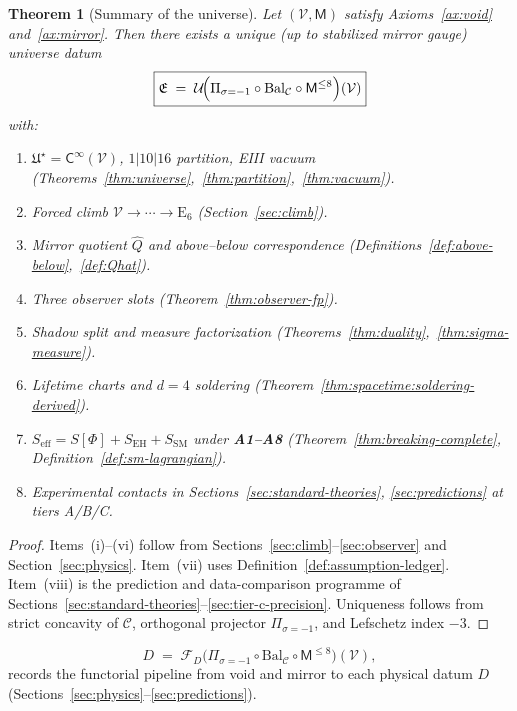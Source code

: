 \documentclass[11pt]{article}
\theoremstyle{plain}
\newtheorem{theorem}{Theorem}[section]
\theoremstyle{definition}
\theoremstyle{remark}
\numberwithin{equation}{section}
\newcommand{\E}[1]{\mathrm{E}_{#1}}
\newcommand{\Void}{\mathcal{V}}
\newcommand{\Mirror}{\mathsf{M}}
\newcommand{\Climb}{\mathsf{C}}
\newcommand{\capacity}{\mathcal{C}}
\newcommand{\orderparam}{\Phi}
\begin{document}
\begin{theorem}[Summary of the universe]\label{thm:universe-summary}
Let $(\Void,\Mirror)$ satisfy Axioms~\ref{ax:void} and~\ref{ax:mirror}. Then
there exists a unique (up to stabilized mirror gauge) universe datum
\begin{equation}\label{eq:universe-summary}
  \boxed{%
  \mathfrak{E}
  \;=\;
  \mathcal{U}\!\Bigl(
    \Pi_{\sigma=-1}\circ\mathrm{Bal}_{\mathcal{C}}\circ\Mirror^{\leq 8}
  \Bigr)(\Void)}
\end{equation}
with:
\begin{enumerate}[label=(\roman*),leftmargin=*]
  \item $\mathfrak{U}^\star=\Climb^\infty(\Void)$, $1|10|16$ partition, EIII
    vacuum (Theorems~\ref{thm:universe},~\ref{thm:partition},~\ref{thm:vacuum}).
  \item Forced climb $\Void\to\cdots\to\E{6}$ (Section~\ref{sec:climb}).
  \item Mirror quotient $\hat Q$ and above--below correspondence
    (Definitions~\ref{def:above-below},~\ref{def:Qhat}).
  \item Three observer slots (Theorem~\ref{thm:observer-fp}).
  \item Shadow split and measure factorization
    (Theorems~\ref{thm:duality},~\ref{thm:sigma-measure}).
  \item Lifetime charts and $d=4$ soldering
    (Theorem~\ref{thm:spacetime:soldering-derived}).
  \item $S_{\mathrm{eff}}=S[\orderparam]+S_{\mathrm{EH}}+S_{\mathrm{SM}}$
    under \textbf{A1--A8}
    (Theorem~\ref{thm:breaking-complete}, Definition~\ref{def:sm-lagrangian}).
  \item Experimental contacts in Sections~\ref{sec:standard-theories},
    \ref{sec:predictions} at tiers A/B/C.
\end{enumerate}
\end{theorem}

\begin{proof}
Items~(i)--(vi) follow from Sections~\ref{sec:climb}--\ref{sec:observer} and
Section~\ref{sec:physics}. Item~(vii) uses Definition~\ref{def:assumption-ledger}.
Item~(viii) is the prediction and data-comparison programme of
Sections~\ref{sec:standard-theories}--\ref{sec:tier-c-precision}.
Uniqueness follows from strict concavity of $\capacity$, orthogonal projector
$\Pi_{\sigma=-1}$, and Lefschetz index $-3$.
\end{proof}

\begin{equation}\label{eq:master-pipeline}
  D
  \;=\;
  \mathcal{F}_D\!\bigl(
    \Pi_{\sigma=-1}\circ\mathrm{Bal}_{\mathcal{C}}\circ\Mirror^{\leq 8}
  \bigr)(\Void),
\end{equation}
records the functorial pipeline from void and mirror to each physical datum
$D$ (Sections~\ref{sec:physics}--\ref{sec:predictions}).
\end{document}
